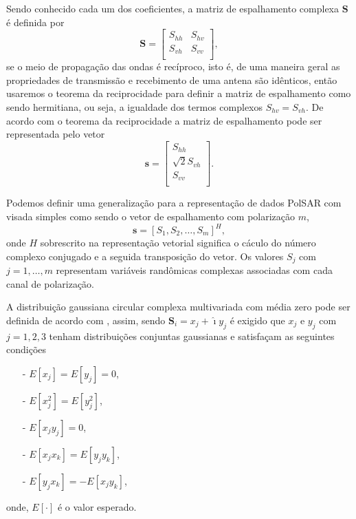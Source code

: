 Sendo conhecido cada um dos coeficientes, a matriz de espalhamento complexa $\mathbf{S}$ é definida por
\begin{equation}\label{cap_acf_2}
\mathbf{S} = \left[
\begin{array}{cc}
	S_{hh}   & S_{hv}   \\
	S_{vh}   & S_{vv}   \\
\end{array}
\right],
\end{equation}
se o meio de propagação das ondas é recíproco, isto é, de uma maneira geral as propriedades de transmissão e recebimento de uma antena são idênticos, então usaremos o teorema da reciprocidade \citet{lp} para definir a matriz de espalhamento como sendo hermitiana, ou seja, a igualdade dos termos complexos $S_{hv}=S_{vh}$. De acordo com o teorema da reciprocidade a matriz de espalhamento pode ser representada pelo vetor
\begin{equation}\label{cap_acf_3}
\mathbf{s} = \left[
\begin{array}{c}
	S_{hh}      \\
        \sqrt{2}S_{vh}     \\
	S_{vv}      \\
\end{array}
\right].
\end{equation}

Podemos definir uma generalização para a representação de dados PolSAR com visada simples como sendo o vetor de espalhamento com polarização $m$, $$\mathbf{s}=[S_1,S_2,\dots,S_m]^H,$$ onde $H$ sobrescrito na representação vetorial significa o cáculo do número complexo conjugado e a seguida transposição do vetor. Os valores $S_j$ com $j=1,\dots,m$ representam variáveis randômicas complexas associadas com cada canal de polarização.

A distribuição gaussiana circular complexa multivariada com média zero pode ser definida de acordo com \citet{goodman}, assim, sendo $\mathbf{S}_i= x_j+\hat{\imath}y_j$ é exigido que $x_j$ e $y_j$ com $j=1,2,3$ tenham distribuições conjuntas gaussianas e satisfaçam as seguintes condições 
\begin{itemize}
	\item[-] $E[x_j]=E[y_j]=0$,
	\item[-] $E[x_j^2]=E[y_j^2]$,
	\item[-] $E[x_jy_j]=0$,
	\item[-] $E[x_jx_k]=E[y_jy_k]$,
	\item[-] $E[y_jx_k]=-E[x_jy_k]$,
\end{itemize}
onde, $E[\cdot]$ é o valor esperado.

